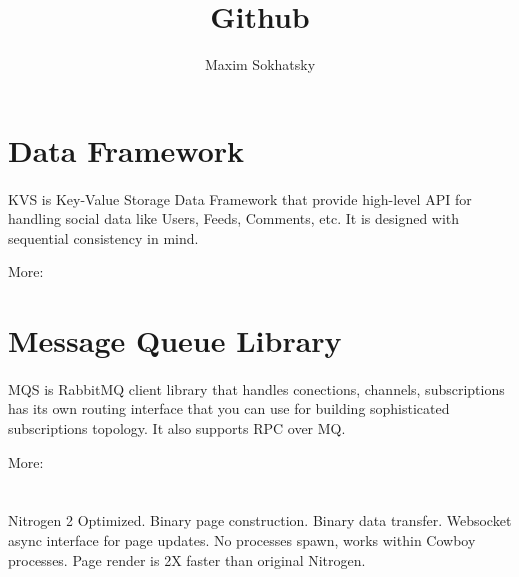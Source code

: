 \documentclass[11pt]{article}
\begin{document}
\title{Github}
\author{Maxim Sokhatsky}



\section*{Data Framework}
\paragraph{}
KVS is Key-Value Storage Data Framework that provide high-level API for handling
social data like Users, Feeds, Comments, etc. It is designed with sequential consistency in mind.

More: 

\section*{Message Queue Library}
\paragraph{}
MQS is RabbitMQ client library that handles conections, channels,
subscriptions has its own routing interface that you can use for building
sophisticated subscriptions topology. It also supports RPC over MQ.

More: 

\section*{}
\paragraph{}
Nitrogen 2 Optimized. Binary page construction. Binary data transfer.
Websocket async interface for page updates. No processes spawn, works
within Cowboy processes. Page render is 2X faster than original Nitrogen.
\end{document}
